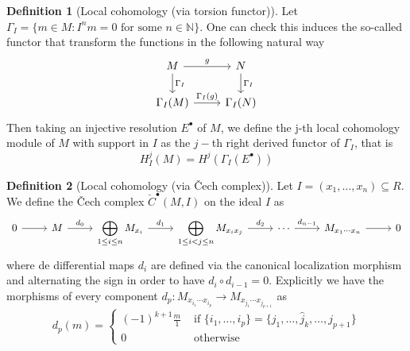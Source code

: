 \documentclass[leqno]{article}
\theoremstyle{definition}
\newtheorem{definition}{Definition}[section]
\begin{document}
\begin{definition}[Local cohomology (via torsion functor)] Let $\Gamma_I= \{m\in M : I^nm = 0 \text{ for some }n\in \mathbb{N} \}$. One can check this induces the so-called functor that transform the functions in the following natural way
\[\begin{tikzcd}
	M & N \\
	{\Gamma_I(M)} & {\Gamma_I(N)}
	\arrow["{\Gamma_I}", from=1-1, to=2-1]
	\arrow["{\Gamma_I}", from=1-2, to=2-2]
	\arrow["g", from=1-1, to=1-2]
	\arrow["{\Gamma_I(g)}", from=2-1, to=2-2]
\end{tikzcd}\]
Then taking an injective resolution $E^\bullet$ of $M$, we define the j-th local cohomology module of $M$ with support in  $I$ as the  $j-$th right derived functor of $\Gamma_I $, that is
\[
H_I^j(M)=H^j(\Gamma _I (E^\bullet) )
\] 
\end{definition}

\begin{definition}[Local cohomology (via \v{C}ech complex)] Let $I=(x_1, \ldots, x_n)\subseteq R$. We define the \v{C}ech complex $\check{C}^{\bullet}(M, I)$ on the ideal $I$ as
\[\begin{tikzcd}
	0 & M & {\displaystyle{\bigoplus_{1\le i\le n} M_{x_i}}} & {\displaystyle{\bigoplus_{1\le i<j\le n} M_{x_ix_j}}} & \cdots & {M_{x_1\cdots x_n}} & 0
	\arrow[from=1-1, to=1-2]
	\arrow["{d_0}", from=1-2, to=1-3]
	\arrow["{d_1}", from=1-3, to=1-4]
	\arrow["{d_2}", from=1-4, to=1-5]
	\arrow["{d_{n-1}}", from=1-5, to=1-6]
	\arrow[from=1-6, to=1-7]
\end{tikzcd}\]
where de differential maps $d_i$ are defined via the canonical localization morphism and alternating the sign in order to have $d_i\circ d_{i-1}=0$. Explicitly we have the morphisms of every component $d_p: M_{x_{i_1}\cdots x_{i_p}} \to M_{x_{j_1}\cdots x_{j_{p+1}}}$ as
\[
  d_p(m) = \begin{cases}
	(-1)^{k+1} \frac{m}{1} &\text{ if } \{i_1, \ldots, i_p\} = \{j_1, \ldots, \hat{j}_k,\ldots, j_{p+1}\}\\ 0 &\text{ otherwise}
  \end{cases}
\] 
\end{definition}
\end{document}
